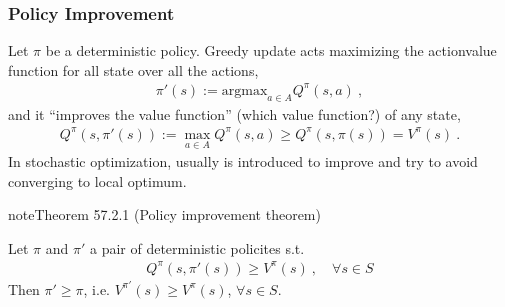 \documentclass[letterpaper,10pt,english]{jupyterBook}
\begin{document}
\subsubsection{Policy Improvement}
\label{\detokenize{ch/rl/mdp_sol_dp_lp:policy-improvement}}\label{\detokenize{ch/rl/mdp_sol_dp_lp:rl-mdp-sol-dp-pi-impr}}
\sphinxAtStartPar
{} Let \(\pi\) be a deterministic policy. Greedy update acts maximizing the action\sphinxhyphen{}value function for all state over all the actions,
\begin{equation*}
\begin{split}\pi'(s) := \text{argmax}_{a \in A} Q^{\pi}(s,a) \ ,\end{split}
\end{equation*}
\sphinxAtStartPar
and it “improves the value function” (which value function?) of any state,
\begin{equation}\label{equation:ch/rl/mdp_sol_dp_lp:eq:greedy}
\begin{split}Q^{\pi}(s,\pi'(s)) := \max_{a \in A} Q^{\pi}(s,a) \ge Q^{\pi}(s,\pi(s)) = V^{\pi}(s) \ .\end{split}
\end{equation}
\sphinxAtStartPar
In stochastic optimization, usually {\hyperref[\detokenize{ch/rl/mdp_sol_rl:rl-mdp-sol-rl-control-improv-eps-greedy}]{}} is introduced to improve  and try to avoid converging to local optimum.
\label{ch/rl/mdp_sol_dp_lp:thm:pi}
\begin{sphinxadmonition}{note}{Theorem 57.2.1 (Policy improvement theorem)}



\sphinxAtStartPar
Let \(\pi\) and \(\pi'\) a pair of deterministic policites s.t.
\begin{equation*}
\begin{split}Q^{\pi}(s, \pi'(s)) \ge V^{\pi}(s) \ , \quad \forall s \in S\end{split}
\end{equation*}
\sphinxAtStartPar
Then \(\pi' \ge \pi\), i.e. \(V^{\pi'}(s) \ge V^{\pi}(s)\), \(\forall s \in S\).
\end{sphinxadmonition}
\end{document}
